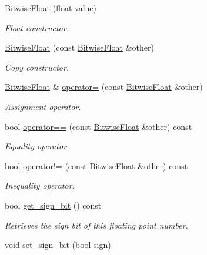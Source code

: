 \begin{DoxyCompactItemize}
\item 
\hyperlink{unionchaos_1_1data_1_1_bitwise_float_a7713ceaaa7cf2a487304088003d94135}{Bitwise\+Float} (float value)
\begin{DoxyCompactList}\small\item\em Float constructor. \end{DoxyCompactList}\item 
\hyperlink{unionchaos_1_1data_1_1_bitwise_float_a37070cb9a8ad9c96c709a2a08467ae77}{Bitwise\+Float} (const \hyperlink{unionchaos_1_1data_1_1_bitwise_float}{Bitwise\+Float} \&other)
\begin{DoxyCompactList}\small\item\em Copy constructor. \end{DoxyCompactList}\item 
\hyperlink{unionchaos_1_1data_1_1_bitwise_float}{Bitwise\+Float} \& \hyperlink{unionchaos_1_1data_1_1_bitwise_float_a2d2fdb0bfa06452e43184cb9a1db30f7}{operator=} (const \hyperlink{unionchaos_1_1data_1_1_bitwise_float}{Bitwise\+Float} \&other)
\begin{DoxyCompactList}\small\item\em Assignment operator. \end{DoxyCompactList}\item 
bool \hyperlink{unionchaos_1_1data_1_1_bitwise_float_a8c9504d5df1069a3b7af9bb1986dcab3}{operator==} (const \hyperlink{unionchaos_1_1data_1_1_bitwise_float}{Bitwise\+Float} \&other) const 
\begin{DoxyCompactList}\small\item\em Equality operator. \end{DoxyCompactList}\item 
bool \hyperlink{unionchaos_1_1data_1_1_bitwise_float_a103eeef1d692951938c2f269ea0accf3}{operator!=} (const \hyperlink{unionchaos_1_1data_1_1_bitwise_float}{Bitwise\+Float} \&other) const 
\begin{DoxyCompactList}\small\item\em Inequality operator. \end{DoxyCompactList}\item 
\hypertarget{unionchaos_1_1data_1_1_bitwise_float_aec1ad0a94dcf984131cc528b574c7d2d}{}bool \hyperlink{unionchaos_1_1data_1_1_bitwise_float_aec1ad0a94dcf984131cc528b574c7d2d}{get\+\_\+sign\+\_\+bit} () const \label{unionchaos_1_1data_1_1_bitwise_float_aec1ad0a94dcf984131cc528b574c7d2d}

\begin{DoxyCompactList}\small\item\em Retrieves the sign bit of this floating point number. \end{DoxyCompactList}\item 
\hypertarget{unionchaos_1_1data_1_1_bitwise_float_a53663822515d674b2fbcad78a758559c}{}void \hyperlink{unionchaos_1_1data_1_1_bitwise_float_a53663822515d674b2fbcad78a758559c}{set\+\_\+sign\+\_\+bit} (bool sign)\label{unionchaos_1_1data_1_1_bitwise_float_a53663822515d674b2fbcad78a758559c}


\end{DoxyCompactItemize}
